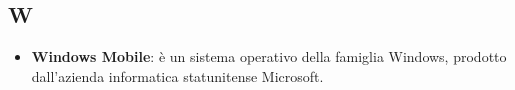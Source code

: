 \subsection{W}
\begin{itemize}
	\item \textbf{Windows Mobile}: è un sistema operativo della famiglia Windows, prodotto dall'azienda informatica statunitense Microsoft.
\end{itemize}